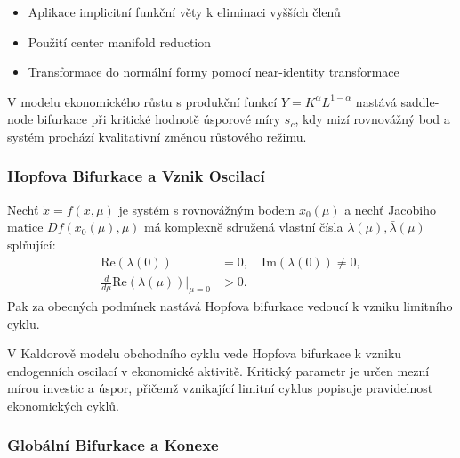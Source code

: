 \begin{proofsketch}
\begin{itemize}
\item Aplikace implicitní funkční věty k eliminaci vyšších členů
\item Použití center manifold reduction
\item Transformace do normální formy pomocí near-identity transformace
\end{itemize}
\end{proofsketch}

\begin{application}
V modelu ekonomického růstu s produkční funkcí $Y = K^\alpha L^{1-\alpha}$ nastává saddle-node bifurkace při kritické hodnotě úsporové míry $s_c$, kdy mizí rovnovážný bod a systém prochází kvalitativní změnou růstového režimu.
\end{application}

\subsubsection{Hopfova Bifurkace a Vznik Oscilací}

\begin{theorem}
Nechť $\dot{x} = f(x, \mu)$ je systém s rovnovážným bodem $x_0(\mu)$ a nechť Jacobiho matice $Df(x_0(\mu), \mu)$ má komplexně sdružená vlastní čísla $\lambda(\mu), \bar{\lambda}(\mu)$ splňující:
\begin{align*}
\mathrm{Re}(\lambda(0)) &= 0, \quad \mathrm{Im}(\lambda(0)) \neq 0, \\
\frac{d}{d\mu}\mathrm{Re}(\lambda(\mu))\big|_{\mu=0} &> 0.
\end{align*}
Pak za obecných podmínek nastává Hopfova bifurkace vedoucí k vzniku limitního cyklu.
\end{theorem}


\begin{application}
V Kaldorově modelu obchodního cyklu vede Hopfova bifurkace k vzniku endogenních oscilací v ekonomické aktivitě. Kritický parametr je určen mezní mírou investic a úspor, přičemž vznikající limitní cyklus popisuje pravidelnost ekonomických cyklů.
\end{application}

\subsubsection{Globální Bifurkace a Konexe}

